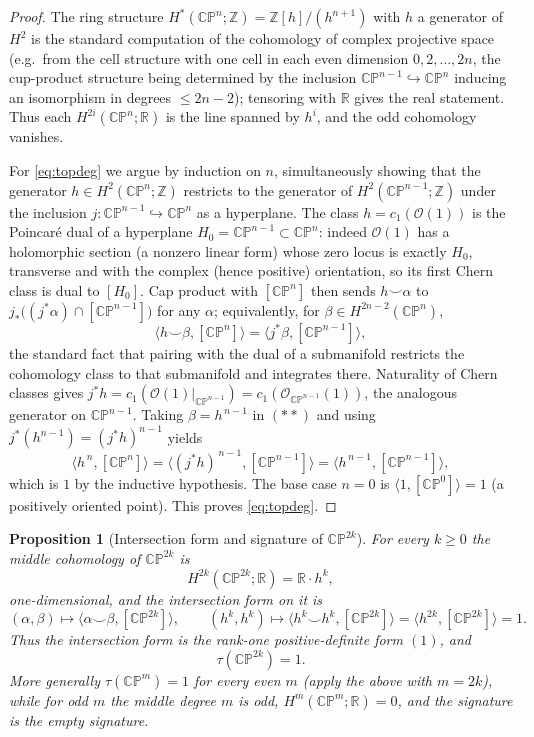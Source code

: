 \documentclass[12pt]{article}
\newtheorem{proposition}{Proposition}
\theoremstyle{definition}
\begin{document}
\begin{proof}
The ring structure $H^*(\mathbb{CP}^n;\mathbb{Z})=\mathbb{Z}[h]/(h^{n+1})$ with
$h$ a generator of $H^2$ is the standard computation of the cohomology of complex
projective space (e.g.\ from the cell structure with one cell in each even dimension
$0,2,\dots,2n$, the cup-product structure being determined by the inclusion
$\mathbb{CP}^{n-1}\hookrightarrow\mathbb{CP}^n$ inducing an isomorphism in degrees
$\le 2n-2$); tensoring with $\mathbb{R}$ gives the real statement.  Thus each
$H^{2i}(\mathbb{CP}^n;\mathbb{R})$ is the line spanned by $h^i$, and the odd cohomology
vanishes.

For \eqref{eq:topdeg} we argue by induction on $n$, simultaneously showing that the
generator $h\in H^2(\mathbb{CP}^n;\mathbb{Z})$ restricts to the generator of
$H^2(\mathbb{CP}^{n-1};\mathbb{Z})$ under the inclusion
$j\colon\mathbb{CP}^{n-1}\hookrightarrow\mathbb{CP}^n$ as a hyperplane.  The class
$h=c_1(\mathcal{O}(1))$ is the Poincar\'e dual of a hyperplane
$H_0=\mathbb{CP}^{n-1}\subset\mathbb{CP}^n$: indeed $\mathcal{O}(1)$ has a holomorphic
section (a nonzero linear form) whose zero locus is exactly $H_0$, transverse and with the
complex (hence positive) orientation, so its first Chern class is dual to $[H_0]$.  Cap
product with $[\mathbb{CP}^n]$ then sends $h\smile\alpha$ to
$j_*\big((j^*\alpha)\cap[\mathbb{CP}^{n-1}]\big)$ for any $\alpha$; equivalently, for
$\beta\in H^{2n-2}(\mathbb{CP}^n)$,
\[
\big\langle h\smile\beta,[\mathbb{CP}^n]\big\rangle
=\big\langle j^*\beta,[\mathbb{CP}^{n-1}]\big\rangle ,
\tag{$\ast\ast$}
\]
the standard fact that pairing with the dual of a submanifold restricts the cohomology
class to that submanifold and integrates there.  Naturality of Chern classes gives
$j^*h=c_1(\mathcal{O}(1)|_{\mathbb{CP}^{n-1}})=c_1(\mathcal{O}_{\mathbb{CP}^{n-1}}(1))$,
the analogous generator on $\mathbb{CP}^{n-1}$.  Taking $\beta=h^{\,n-1}$ in $(\ast\ast)$
and using $j^*(h^{n-1})=(j^*h)^{n-1}$ yields
\[
\big\langle h^{\,n},[\mathbb{CP}^n]\big\rangle
=\big\langle (j^*h)^{\,n-1},[\mathbb{CP}^{n-1}]\big\rangle
=\big\langle h^{\,n-1},[\mathbb{CP}^{n-1}]\big\rangle ,
\]
which is $1$ by the inductive hypothesis.  The base case $n=0$ is
$\langle 1,[\mathbb{CP}^0]\rangle=1$ (a positively oriented point).  This proves
\eqref{eq:topdeg}.
\end{proof}

\begin{proposition}[Intersection form and signature of $\mathbb{CP}^{2k}$]\label{prop:sig}
For every $k\ge 0$ the middle cohomology of $\mathbb{CP}^{2k}$ is
\[
H^{2k}(\mathbb{CP}^{2k};\mathbb{R})=\mathbb{R}\cdot h^{k},
\]
one-dimensional, and the intersection form on it is
\[
(\alpha,\beta)\longmapsto\langle\alpha\smile\beta,[\mathbb{CP}^{2k}]\rangle,
\qquad
(h^k,h^k)\longmapsto\big\langle h^{k}\smile h^{k},[\mathbb{CP}^{2k}]\big\rangle
=\big\langle h^{2k},[\mathbb{CP}^{2k}]\big\rangle=1.
\]
Thus the intersection form is the rank-one positive-definite form $(1)$, and
\[
\tau(\mathbb{CP}^{2k})=1.
\]
More generally $\tau(\mathbb{CP}^m)=1$ for every even $m$ (apply the above with
$m=2k$), while for odd $m$ the middle degree $m$ is odd, $H^m(\mathbb{CP}^m;\mathbb{R})=0$,
and the signature is the empty signature.
\end{proposition}
\end{document}

